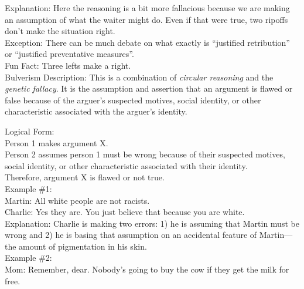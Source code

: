 \documentclass[a4paper,12pt,single,pdftex]{scrbook}
\begin{document}
    
      Explanation: Here the reasoning is a bit more fallacious because we are making an assumption of what the waiter might do.  Even if that were true, two ripoffs don’t make the situation right.
    \\

    
      Exception: There can be much debate on what exactly is “justified retribution” or “justified preventative measures”.
    \\

    
      Fun Fact: Three lefts make a right.
    \\

  

Bulverism
    Description: This is a combination of {\it circular reasoning}  and the {\it genetic fallacy}. It is the assumption and assertion that an argument is flawed or false because of the arguer's suspected motives, social identity, or other characteristic associated with the arguer's identity.

    
      Logical Form:
    \\

    
      Person 1 makes argument X.
    \\

    
      Person 2 assumes person 1 must be wrong because of their suspected motives, social identity, or other characteristic associated with their identity.
    \\

    
      Therefore, argument X is flawed or not true.
    \\

    
      Example \#1:
    \\

    
      Martin: All white people are not racists.
    \\

    
      Charlie: Yes they are. You just believe that because you are white.
    \\

    
      Explanation: Charlie is making two errors: 1) he is assuming that Martin must be wrong and 2) he is basing that assumption on an accidental feature of Martin—the amount of pigmentation in his skin.
    \\

    
      Example \#2:
    \\

    
      Mom: Remember, dear. Nobody's going to buy the cow if they get the milk for free.
    \\
\end{document}
